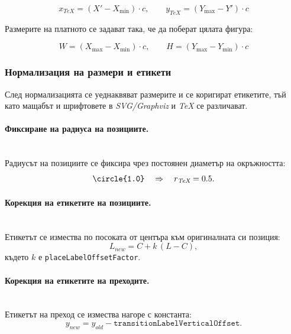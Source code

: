 \begin{equation}
x_{\textit{TeX}} = (X' - X_{\min})\cdot c,\qquad
y_{\textit{TeX}} = (Y_{\max} - Y')\cdot c
\label{eq:tex-normalization}
\end{equation}

Размерите на платното се задават така, че да поберат цялата фигура:

\vspace{-0.2cm}

\begin{equation}
W = (X_{\max}-X_{\min})\cdot c,\qquad
H = (Y_{\max}-Y_{\min})\cdot c
\label{eq:picture-dimensions}
\end{equation}

\subsubsection{Нормализация на размери и етикети}
\hspace*{2.5em}След нормализацията се уеднаквяват размерите и се коригират етикетите, тъй като мащабът и шрифтовете в \textit{SVG/Graphviz} и \textit{TeX} се различават.

\paragraph{Фиксиране на радиуса на позициите.}
\mbox{}\\
Радиусът на позициите се фиксира чрез постоянен диаметър на окръжността:
\begin{equation}
\text{\texttt{\textbackslash circle\{1.0\}}} \quad \Rightarrow \quad r_{\textit{TeX}} = 0.5.
\label{eq:fixed-place-radius}
\end{equation}

\paragraph{Корекция на етикетите на позициите.}
\mbox{}\\
Етикетът се измества по посоката от центъра към оригиналната си позиция:
\begin{equation}
L_{\textit{new}} = C + k\,(L-C),
\label{eq:place-label-shift}
\end{equation}
където $k$ е \texttt{placeLabelOffsetFactor}.

\paragraph{Корекция на етикетите на преходите.}
\mbox{}\\
Етикетът на преход се измества нагоре с константа:
\begin{equation}
y_{\textit{new}} = y_{\textit{old}} - \texttt{transitionLabelVerticalOffset}.
\label{eq:transition-label-offset}
\end{equation}


